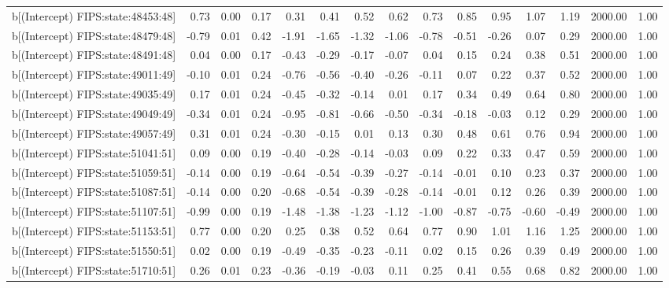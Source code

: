 \begin{table}[ht]
\begin{tabular}{rrrrrrrrrrrrrrr}
  b[(Intercept) FIPS:state:48453:48] & 0.73 & 0.00 & 0.17 & 0.31 & 0.41 & 0.52 & 0.62 & 0.73 & 0.85 & 0.95 & 1.07 & 1.19 & 2000.00 & 1.00 \\ 
  b[(Intercept) FIPS:state:48479:48] & -0.79 & 0.01 & 0.42 & -1.91 & -1.65 & -1.32 & -1.06 & -0.78 & -0.51 & -0.26 & 0.07 & 0.29 & 2000.00 & 1.00 \\ 
  b[(Intercept) FIPS:state:48491:48] & 0.04 & 0.00 & 0.17 & -0.43 & -0.29 & -0.17 & -0.07 & 0.04 & 0.15 & 0.24 & 0.38 & 0.51 & 2000.00 & 1.00 \\ 
  b[(Intercept) FIPS:state:49011:49] & -0.10 & 0.01 & 0.24 & -0.76 & -0.56 & -0.40 & -0.26 & -0.11 & 0.07 & 0.22 & 0.37 & 0.52 & 2000.00 & 1.00 \\ 
  b[(Intercept) FIPS:state:49035:49] & 0.17 & 0.01 & 0.24 & -0.45 & -0.32 & -0.14 & 0.01 & 0.17 & 0.34 & 0.49 & 0.64 & 0.80 & 2000.00 & 1.00 \\ 
  b[(Intercept) FIPS:state:49049:49] & -0.34 & 0.01 & 0.24 & -0.95 & -0.81 & -0.66 & -0.50 & -0.34 & -0.18 & -0.03 & 0.12 & 0.29 & 2000.00 & 1.00 \\ 
  b[(Intercept) FIPS:state:49057:49] & 0.31 & 0.01 & 0.24 & -0.30 & -0.15 & 0.01 & 0.13 & 0.30 & 0.48 & 0.61 & 0.76 & 0.94 & 2000.00 & 1.00 \\ 
  b[(Intercept) FIPS:state:51041:51] & 0.09 & 0.00 & 0.19 & -0.40 & -0.28 & -0.14 & -0.03 & 0.09 & 0.22 & 0.33 & 0.47 & 0.59 & 2000.00 & 1.00 \\ 
  b[(Intercept) FIPS:state:51059:51] & -0.14 & 0.00 & 0.19 & -0.64 & -0.54 & -0.39 & -0.27 & -0.14 & -0.01 & 0.10 & 0.23 & 0.37 & 2000.00 & 1.00 \\ 
  b[(Intercept) FIPS:state:51087:51] & -0.14 & 0.00 & 0.20 & -0.68 & -0.54 & -0.39 & -0.28 & -0.14 & -0.01 & 0.12 & 0.26 & 0.39 & 2000.00 & 1.00 \\ 
  b[(Intercept) FIPS:state:51107:51] & -0.99 & 0.00 & 0.19 & -1.48 & -1.38 & -1.23 & -1.12 & -1.00 & -0.87 & -0.75 & -0.60 & -0.49 & 2000.00 & 1.00 \\ 
  b[(Intercept) FIPS:state:51153:51] & 0.77 & 0.00 & 0.20 & 0.25 & 0.38 & 0.52 & 0.64 & 0.77 & 0.90 & 1.01 & 1.16 & 1.25 & 2000.00 & 1.00 \\ 
  b[(Intercept) FIPS:state:51550:51] & 0.02 & 0.00 & 0.19 & -0.49 & -0.35 & -0.23 & -0.11 & 0.02 & 0.15 & 0.26 & 0.39 & 0.49 & 2000.00 & 1.00 \\ 
  b[(Intercept) FIPS:state:51710:51] & 0.26 & 0.01 & 0.23 & -0.36 & -0.19 & -0.03 & 0.11 & 0.25 & 0.41 & 0.55 & 0.68 & 0.82 & 2000.00 & 1.00 \\ 

\end{tabular}
\end{table}
